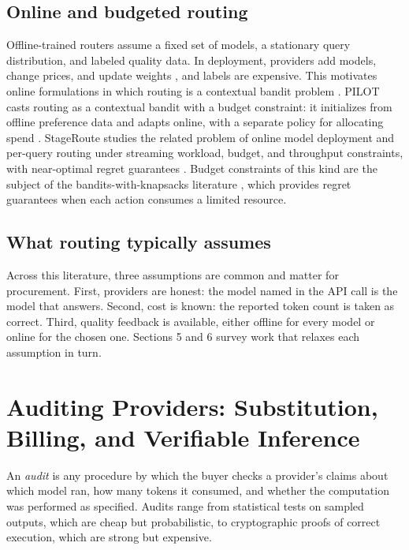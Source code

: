 \documentclass[sigconf]{acmart}
\begin{document}
\subsection{Online and budgeted routing}\label{online-and-budgeted-routing}

Offline-trained routers assume a fixed set of models, a stationary query distribution, and labeled quality data. In deployment, providers add models, change prices, and update weights \cite{chen2024drift}, and labels are expensive. This motivates online formulations in which routing is a contextual bandit problem \cite{lattimore2020bandit, auer2002ucb}. PILOT casts routing as a contextual bandit with a budget constraint: it initializes from offline preference data and adapts online, with a separate policy for allocating spend \cite{panda2025pilot}. StageRoute studies the related problem of online model deployment and per-query routing under streaming workload, budget, and throughput constraints, with near-optimal regret guarantees \cite{li2026stageroute}. Budget constraints of this kind are the subject of the bandits-with-knapsacks literature \cite{badanidiyuru2018bwk}, which provides regret guarantees when each action consumes a limited resource.

\subsection{What routing typically assumes}\label{what-routing-typically-assumes}

Across this literature, three assumptions are common and matter for procurement. First, providers are honest: the model named in the API call is the model that answers. Second, cost is known: the reported token count is taken as correct. Third, quality feedback is available, either offline for every model or online for the chosen one. Sections 5 and 6 survey work that relaxes each assumption in turn.

\section{Auditing Providers: Substitution, Billing, and Verifiable Inference}\label{auditing-providers-substitution-billing-and-verifiable-inference}

An \emph{audit} is any procedure by which the buyer checks a provider's claims about which model ran, how many tokens it consumed, and whether the computation was performed as specified. Audits range from statistical tests on sampled outputs, which are cheap but probabilistic, to cryptographic proofs of correct execution, which are strong but expensive.
\end{document}
